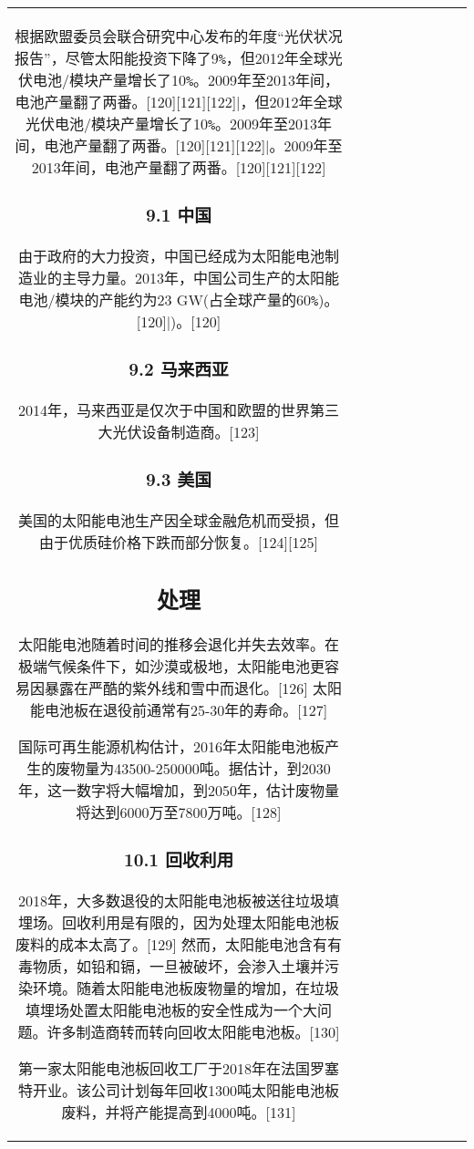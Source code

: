 \begin{table}[ht]
\begin{tabular}{|c|c|c|c|c|c|c|c|c}
根据欧盟委员会联合研究中心发布的年度“光伏状况报告”，尽管太阳能投资下降了9\verb|%|，但2012年全球光伏电池/模块产量增长了10\verb|%|。2009年至2013年间，电池产量翻了两番。[120][121][122]

\subsubsection{9.1 中国}

由于政府的大力投资，中国已经成为太阳能电池制造业的主导力量。2013年，中国公司生产的太阳能电池/模块的产能约为23 GW(占全球产量的60\verb|%|)。[120]

\subsubsection{9.2 马来西亚}

2014年，马来西亚是仅次于中国和欧盟的世界第三大光伏设备制造商。[123]

\subsubsection{9.3 美国}

美国的太阳能电池生产因全球金融危机而受损，但由于优质硅价格下跌而部分恢复。[124][125]

\subsection{处理}

太阳能电池随着时间的推移会退化并失去效率。在极端气候条件下，如沙漠或极地，太阳能电池更容易因暴露在严酷的紫外线和雪中而退化。[126] 太阳能电池板在退役前通常有25-30年的寿命。[127]

国际可再生能源机构估计，2016年太阳能电池板产生的废物量为43500-250000吨。据估计，到2030年，这一数字将大幅增加，到2050年，估计废物量将达到6000万至7800万吨。[128]

\subsubsection{10.1 回收利用}

2018年，大多数退役的太阳能电池板被送往垃圾填埋场。回收利用是有限的，因为处理太阳能电池板废料的成本太高了。[129] 然而，太阳能电池含有有毒物质，如铅和镉，一旦被破坏，会渗入土壤并污染环境。随着太阳能电池板废物量的增加，在垃圾填埋场处置太阳能电池板的安全性成为一个大问题。许多制造商转而转向回收太阳能电池板。[130]

第一家太阳能电池板回收工厂于2018年在法国罗塞特开业。该公司计划每年回收1300吨太阳能电池板废料，并将产能提高到4000吨。[131]


\end{tabular}
\end{table}
